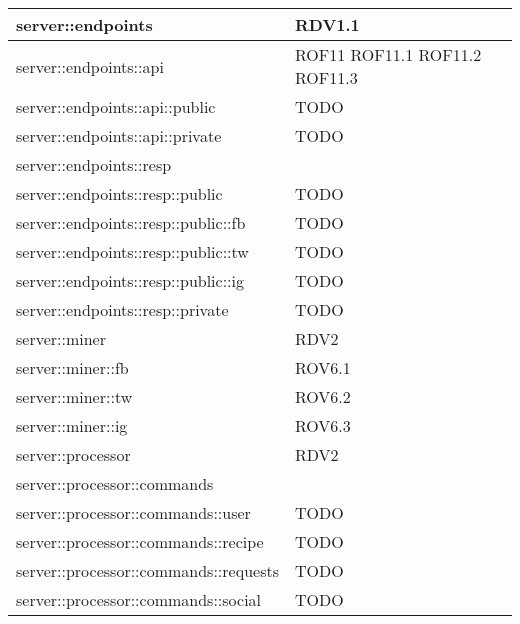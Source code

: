 \begin{center}
\begin{longtable}{| p{9cm} | p{4cm} |}
\hline
server::endpoints  & RDV1.1 \\
\hline
server::endpoints::api  &  ROF11 \newline ROF11.1 \newline ROF11.2 \newline ROF11.3 \\
\hline
server::endpoints::api::public  &  TODO \\
\hline
server::endpoints::api::private  &  TODO \\
\hline
server::endpoints::resp  &  \\
\hline
server::endpoints::resp::public  &  TODO \\
\hline
server::endpoints::resp::public::fb  &  TODO \\
\hline
server::endpoints::resp::public::tw  &  TODO \\
\hline
server::endpoints::resp::public::ig  &  TODO \\
\hline
server::endpoints::resp::private  &  TODO \\
\hline
server::miner  & RDV2 \\
\hline
server::miner::fb  &  ROV6.1 \\
\hline
server::miner::tw  &  ROV6.2 \\
\hline
server::miner::ig  &  ROV6.3 \\
\hline
server::processor  & RDV2 \\
\hline
server::processor::commands  &  \\
\hline
server::processor::commands::user  &  TODO \\
\hline
server::processor::commands::recipe  &  TODO \\
\hline
server::processor::commands::requests  &  TODO \\
\hline
server::processor::commands::social  &  TODO \\
\hline
\end{longtable}
\egroup
\end{center}
